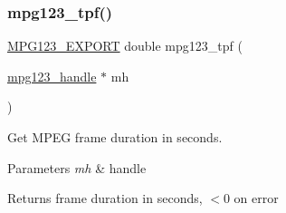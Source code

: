 \subsubsection{\texorpdfstring{mpg123\_tpf()}{mpg123\_tpf()}}
{\footnotesize\ttfamily \mbox{\hyperlink{mpg123_8h_a2ba98cfba3f760879df70e755b2a61cc}{M\+P\+G123\+\_\+\+E\+X\+P\+O\+RT}} double mpg123\+\_\+tpf (\begin{DoxyParamCaption}\item[{\mbox{\hyperlink{group__mpg123__init_ga6728e2839a395f3a07d4514da659faca}{mpg123\+\_\+handle}} $\ast$}]{mh }\end{DoxyParamCaption})}

Get M\+P\+EG frame duration in seconds. 
\begin{DoxyParams}{Parameters}
{\em mh} & handle \\
\hline
\end{DoxyParams}
\begin{DoxyReturn}{Returns}
frame duration in seconds, $<$0 on error 
\end{DoxyReturn}
